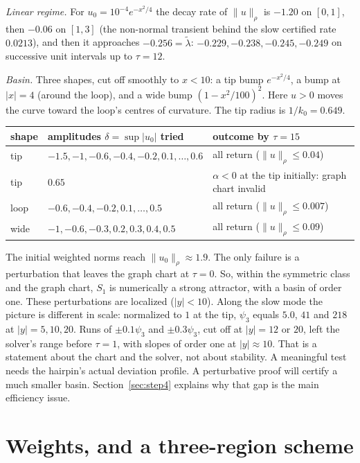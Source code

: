 \documentclass[11pt]{amsart}
\theoremstyle{remark}
\begin{document}
\emph{Linear regime.} For $u_0=10^{-4}e^{-x^2/4}$ the decay rate of $\|u\|_\rho$ is $-1.20$ on $[0,1]$, then $-0.06$ on $[1,3]$ (the non-normal transient behind the slow certified rate $0.0213$), and then it approaches $-0.256=\tilde\lambda$: $-0.229,-0.238,-0.245,-0.249$ on successive unit intervals up to $\tau=12$.

\emph{Basin.} Three shapes, cut off smoothly to $x<10$: a tip bump $e^{-x^2/4}$, a bump at $|x|=4$ (around the loop), and a wide bump $(1-x^2/100)^2$. Here $u>0$ moves the curve toward the loop's centres of curvature. The tip radius is $1/k_0=0.649$.
\begin{center}
\begin{tabular}{@{}lll@{}}
\toprule
shape & amplitudes $\delta=\sup|u_0|$ tried & outcome by $\tau=15$\\
\midrule
tip & $-1.5,-1,-0.6,-0.4,-0.2,0.1,\dots,0.6$ & all return ($\|u\|_\rho\le0.04$)\\
tip & $0.65$ & $\alpha<0$ at the tip initially: graph chart invalid\\
loop & $-0.6,-0.4,-0.2,0.1,\dots,0.5$ & all return ($\|u\|_\rho\le0.007$)\\
wide & $-1,-0.6,-0.3,0.2,0.3,0.4,0.5$ & all return ($\|u\|_\rho\le0.09$)\\
\bottomrule
\end{tabular}
\end{center}
The initial weighted norms reach $\|u_0\|_\rho\approx1.9$. The only failure is a perturbation that leaves the graph chart at $\tau=0$. So, within the symmetric class and the graph chart, $S_1$ is numerically a strong attractor, with a basin of order one. These perturbations are localized ($|y|<10$). Along the slow mode the picture is different in scale: normalized to $1$ at the tip, $\psi_3$ equals $5.0$, $41$ and $218$ at $|y|=5,10,20$. Runs of $\pm0.1\psi_3$ and $\pm0.3\psi_3$, cut off at $|y|=12$ or $20$, left the solver's range before $\tau=1$, with slopes of order one at $|y|\approx10$. That is a statement about the chart and the solver, not about stability. A meaningful test needs the hairpin's actual deviation profile. A perturbative proof will certify a much smaller basin. Section~\ref{sec:step4} explains why that gap is the main efficiency issue.

\section{Weights, and a three-region scheme}\label{sec:regions}
\end{document}
